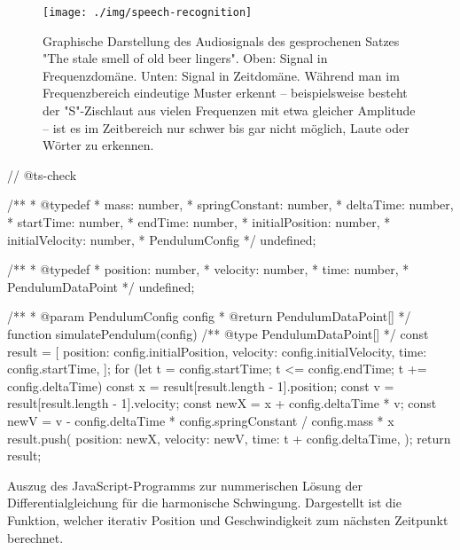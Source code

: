 \begin{figure}[H]
    \centering
    \texttt{[image: ./img/speech-recognition]}
    \caption[Frequenzspektrum eines Audiosignals]{Graphische Darstellung des Audiosignals des gesprochenen Satzes "The stale smell of old beer lingers". Oben: Signal in Frequenzdomäne. Unten: Signal in Zeitdomäne. Während man im Frequenzbereich eindeutige Muster erkennt -- beispielsweise besteht der "S"-Zischlaut aus vielen Frequenzen mit etwa gleicher Amplitude -- ist es im Zeitbereich nur schwer bis gar nicht möglich, Laute oder Wörter zu erkennen.}
    \label{fig:SpeechFreq}
\end{figure}

\begin{listing}
\begin{jscode}
// @ts-check

/**
 * @typedef {{
 *   mass: number,
 *   springConstant: number,
 *   deltaTime: number,
 *   startTime:  number,
 *   endTime: number,
 *   initialPosition: number,
 *   initialVelocity: number,
 * }} PendulumConfig
 */
undefined;

/**
 * @typedef {{
 *   position: number,
 *   velocity: number,
 *   time: number,
 * }} PendulumDataPoint
 */
undefined;

/**
 * @param {PendulumConfig} config
 * @return {PendulumDataPoint[]}
 */
function simulatePendulum(config) {
    /** @type {PendulumDataPoint[]} */
    const result = [{
        position: config.initialPosition,
        velocity: config.initialVelocity,
        time: config.startTime,
    }];
    for (let t = config.startTime; t <= config.endTime; t += config.deltaTime) {
        const x = result[result.length - 1].position;
        const v = result[result.length - 1].velocity;
        const newX = x + config.deltaTime * v;
        const newV = v - config.deltaTime * config.springConstant / config.mass * x
        result.push({
            position: newX,
            velocity: newV,
            time: t + config.deltaTime,
        });
    }
    return result;
}
\end{jscode}
    \caption[Code Nummerische Lösung DGL]{Auszug des JavaScript-Programms zur nummerischen Lösung der Differentialgleichung für die harmonische Schwingung. Dargestellt ist die Funktion, welcher iterativ Position und Geschwindigkeit zum nächsten Zeitpunkt berechnet.}
    \label{lst:NumSolveCode}
\end{listing}